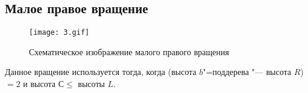 \begin{frame}
    \subsection*{Малое правое вращение}

    \begin{figure}[ht]
        \texttt{[image: 3.gif]}
        
        \caption{Схематическое изображение малого правого вращения}
    \end{figure}

    Данное вращение используется тогда,
    когда (высота $b$"=поддерева "--- высота $R$)
    $= 2$ и высота $С \leqslant $ высоты $L$.
\end{frame}